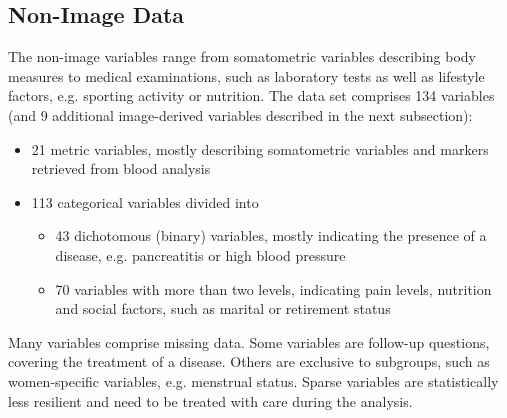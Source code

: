 \documentclass[a4paper,twoside]{style/article}
\newcommand{\com}[1]{\textcolor{orange}{\uline{#1}}}
\begin{document}
\subsection{Non-Image Data}
The non-image variables range from somatometric variables describing body measures to medical examinations, such as laboratory tests as well as lifestyle factors, e.g. sporting activity or nutrition.
The data set comprises 134 variables (and 9 additional image-derived variables described in the next subsection):
\begin{itemize}
	\item 21 metric variables, mostly describing somatometric variables and markers retrieved from blood analysis
	\item 113 categorical variables divided into
	\begin{itemize}
		\item 43 dichotomous (binary) variables, mostly indicating the presence of a disease, e.g. pancreatitis or high blood pressure
		\item 70 variables with more than two levels, indicating pain levels, nutrition and social factors, such as marital or retirement status
	\end{itemize}
\end{itemize}
Many variables comprise missing data.
Some variables are follow-up questions, covering the treatment of a disease.
Others are exclusive to subgroups, such as women-specific variables, e.g. menstrual status.
Sparse variables are statistically less resilient and need to be treated with care during the analysis.
\end{document}
